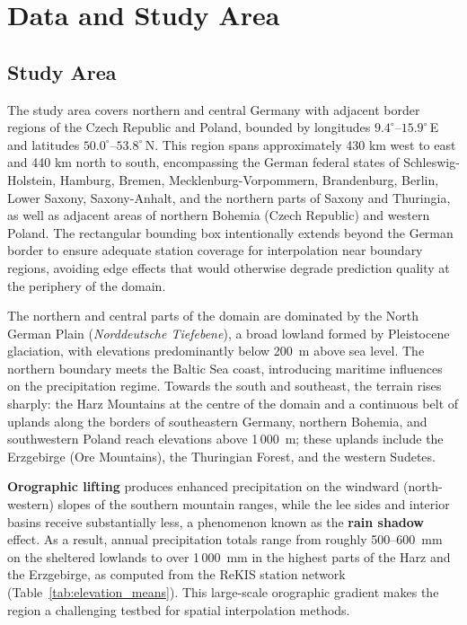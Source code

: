 \chapter{Data and Study Area}
\label{ch:data}

\section{Study Area}

The study area covers northern and central Germany with adjacent border regions
of the Czech Republic and Poland, bounded by longitudes $9.4^\circ$--$15.9^\circ$\,E
and latitudes $50.0^\circ$--$53.8^\circ$\,N.
This region spans approximately 430 km west to east and 440 km north to south,
encompassing the German federal states of Schleswig-Holstein, Hamburg, Bremen,
Mecklenburg-Vorpommern, Brandenburg, Berlin, Lower Saxony, Saxony-Anhalt, and
the northern parts of Saxony and Thuringia, as well as adjacent areas of
northern Bohemia (Czech Republic) and western Poland. The rectangular bounding
box intentionally extends beyond the German border to ensure adequate station
coverage for interpolation near boundary regions, avoiding edge effects that
would otherwise degrade prediction quality at the periphery of the domain.

The northern and central parts of the domain are dominated by the North German
Plain (\textit{Norddeutsche Tiefebene}), a broad lowland formed by
Pleistocene glaciation, with elevations predominantly below 200~m above sea
level.  The northern boundary meets the Baltic Sea coast, introducing maritime
influences on the precipitation regime.  Towards the south and southeast,
the terrain rises sharply: the Harz Mountains at the centre of the domain and
a continuous belt of uplands along the borders of southeastern Germany,
northern Bohemia, and southwestern Poland reach elevations above 1\,000~m;
these uplands include the Erzgebirge (Ore Mountains), the Thuringian Forest,
and the western Sudetes.

\textbf{Orographic lifting} \cite{daly1994prism} produces enhanced
precipitation on the windward (north-western) slopes of the southern
mountain ranges, while the lee sides and interior basins receive
substantially less, a phenomenon known as the \textbf{rain shadow} effect.
As a result, annual precipitation totals range from roughly
500--600~mm on the sheltered lowlands to over 1\,000~mm in the highest
parts of the Harz and the Erzgebirge, as computed from the ReKIS station
network (Table~\ref{tab:elevation_means}).
This large-scale orographic gradient makes the region a challenging
testbed for spatial interpolation methods.

